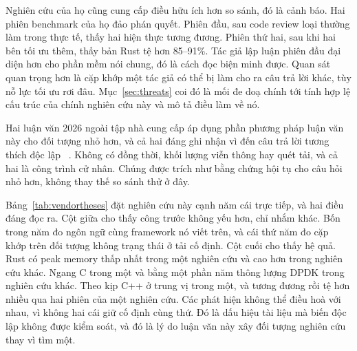 Nghiên cứu của họ cũng cung cấp điều hữu ích hơn so sánh, đó là cảnh báo.
Hai phiên benchmark của họ đảo phán quyết. Phiên đầu, sau code review loại
thường làm trong thực tế, thấy hai hiện thực tương đương. Phiên thứ hai, sau khi hai bên
tối ưu thêm, thấy bản Rust tệ hơn 85--91\%. Tác giả lập luận
phiên đầu đại diện hơn cho phần mềm nói chung, đó là cách đọc biện minh được. Quan sát quan trọng hơn là cặp khớp một tác giả có thể bị làm
cho ra câu trả lời khác, tùy nỗ lực tối ưu rơi đâu.
Mục~\ref{sec:threats} coi đó là mối đe doạ chính tới tính hợp lệ cấu trúc của chính nghiên cứu này và mô tả điều làm về nó.

Hai luận văn 2026 ngoài tập nhà cung cấp áp dụng phần phương pháp luận văn này cho đối tượng
nhỏ hơn, và cả hai đáng ghi nhận vì đến câu trả lời tương thích độc lập
~\cite{sundvisson2026drivers,andersson2026stdmemsafety}. Không có đồng thời, khối lượng viễn thông hay quét
tải, và cả hai là công trình cử nhân. Chúng được trích như bằng chứng hội tụ cho câu hỏi
nhỏ hơn, không thay thế so sánh thử ở đây.

Bảng~\ref{tab:vendortheses} đặt nghiên cứu này cạnh năm cái trực tiếp, và hai điều đáng
đọc ra. Cột giữa cho thấy công trước không yếu hơn, chỉ nhắm khác. Bốn trong năm đo ngôn ngữ cùng framework nó viết trên,
và cái thứ năm đo cặp khớp trên đối tượng không trạng thái ở tải cố định. Cột cuối cho thấy
hệ quả. Rust có peak memory thấp nhất trong một nghiên cứu và cao hơn trong
nghiên cứu khác. Ngang C trong một và bằng một phần năm thông lượng DPDK trong nghiên cứu khác. Theo kịp C++ ở trung vị trong một, và tương đương rồi tệ hơn nhiều qua hai phiên của một
nghiên cứu. Các phát hiện không thể điều hoà với nhau, vì không hai cái giữ cố định
cùng thứ. Đó là dấu hiệu tài liệu mà biến độc lập
không được kiểm soát, và đó là lý do luận văn này xây đối tượng nghiên cứu thay vì
tìm một.

